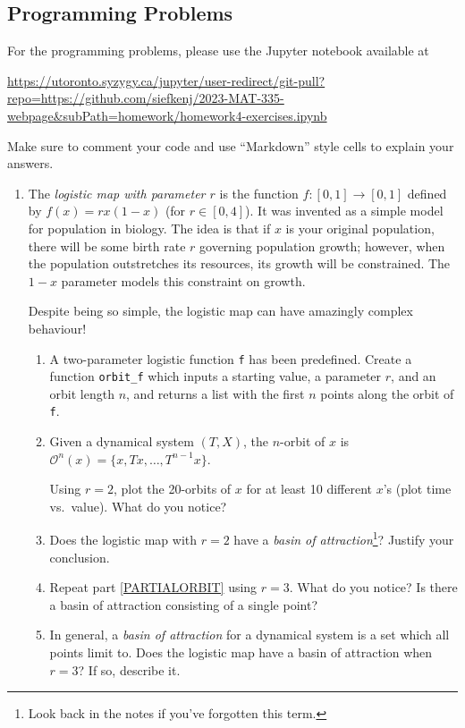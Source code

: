 \documentclass[letter]{article}
\begin{document}
	\subsection*{Programming Problems}
	For the programming problems, please use the Jupyter notebook available at

	\url{https://utoronto.syzygy.ca/jupyter/user-redirect/git-pull?repo=https://github.com/siefkenj/2023-MAT-335-webpage&subPath=homework/homework4-exercises.ipynb}

	Make sure to comment your code and use ``Markdown'' style cells to explain your answers.

	\begin{enumerate}
		\item The \emph{logistic map with parameter $r$} is the function $f:[0,1]\to[0,1]$ defined by $f(x)=rx(1-x)$ (for $r\in[0,4]$).
			It was invented as a simple model for population in biology. The idea is that if $x$ is your original population,
			there will be some birth rate $r$ governing population growth; however, when the population outstretches its
			resources, its growth will be constrained. The $1-x$ parameter models this constraint on growth.

			Despite being so simple, the logistic map can have amazingly complex behaviour!

		\begin{enumerate}
			\item A two-parameter logistic function {\tt f} has been predefined. Create a function \verb|orbit_f| which inputs
				a starting value, a parameter $r$, and an orbit length $n$, and returns a list with the first
				$n$ points along the orbit of {\tt f}.

			\item \label{PARTIALORBIT}Given a dynamical system $(T,X)$, the $n$-orbit of $x$ is $\mathcal O^n(x)=\{x,Tx,\ldots, T^{n-1}x\}$.

				Using $r=2$, plot the 20-orbits of $x$ for at least 10 different $x$'s (plot time vs.~value). What do you notice?
			\item Does the logistic map with $r=2$ have a \emph{basin of attraction}\footnote{ Look back in the notes
				if you've forgotten this term.}? Justify your conclusion.
			\item Repeat part \ref{PARTIALORBIT} using $r=3$. What do you notice? Is there a basin of attraction consisting of a single point?

			\item In general, a \emph{basin of attraction} for a dynamical system is a set which all points limit to.
				Does the logistic map have a basin of attraction when $r=3$? If so, describe it.


\end{enumerate}
\end{enumerate}
\end{document}
